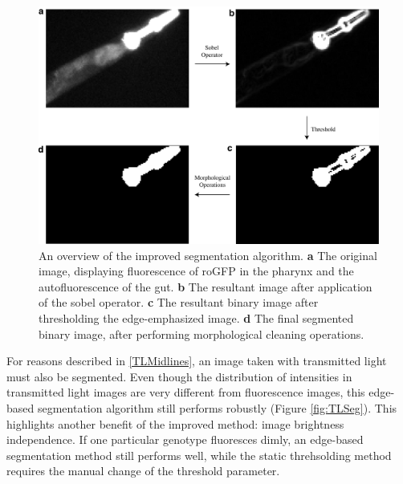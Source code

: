 \begin{figure}[ht]
    \centering
    \includegraphics[scale=.40]{Figures/rendered_files/sobel}
    \decoRule
    \caption[Overview of the improved segmentation algorithm]{An overview of the improved segmentation algorithm. \textbf{a} The original image, displaying fluorescence of roGFP in the pharynx and the autofluorescence of the gut. \textbf{b} The resultant image after application of the sobel operator. \textbf{c} The resultant binary image after thresholding the edge-emphasized image. \textbf{d} The final segmented binary image, after performing morphological cleaning operations.}
    \label{fig:NewPipeline}
\end{figure}

For reasons described in \ref{TLMidlines}, an image taken with transmitted light must also be segmented. Even though the distribution of intensities in transmitted light images are very different from fluorescence images, this edge-based segmentation algorithm still performs robustly (Figure \ref{fig:TLSeg}). This highlights another benefit of the improved method: image brightness independence. If one particular genotype fluoresces dimly, an edge-based segmentation method still performs well, while the static threhsolding method requires the manual change of the threshold parameter.

